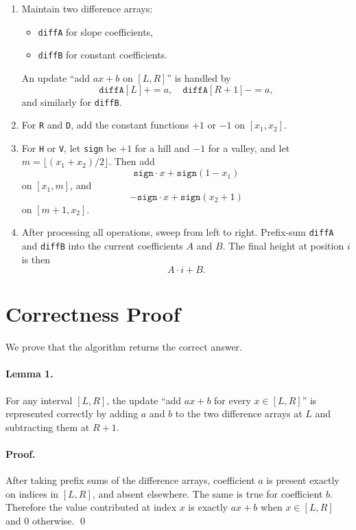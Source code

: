 \documentclass[11pt]{article}
\begin{document}
\begin{enumerate}[leftmargin=*]
    \item Maintain two difference arrays:
    \begin{itemize}[leftmargin=*]
        \item \texttt{diffA} for slope coefficients,
        \item \texttt{diffB} for constant coefficients.
    \end{itemize}
    An update ``add $ax+b$ on $[L,R]$'' is handled by
    \[
        \texttt{diffA}[L] += a,\quad \texttt{diffA}[R+1] -= a,
    \]
    and similarly for \texttt{diffB}.
    \item For \texttt{R} and \texttt{D}, add the constant functions $+1$ or $-1$ on $[x_1,x_2]$.
    \item For \texttt{H} or \texttt{V}, let \texttt{sign} be $+1$ for a hill and $-1$ for a valley, and let
    $m=\lfloor (x_1+x_2)/2 \rfloor$.
    Then add
    \[
        \texttt{sign} \cdot x + \texttt{sign}(1-x_1)
    \]
    on $[x_1,m]$, and
    \[
        -\texttt{sign} \cdot x + \texttt{sign}(x_2+1)
    \]
    on $[m+1,x_2]$.
    \item After processing all operations, sweep from left to right.
    Prefix-sum \texttt{diffA} and \texttt{diffB} into the current coefficients $A$ and $B$.
    The final height at position $i$ is then
    \[
        A \cdot i + B.
    \]
\end{enumerate}

\section*{Correctness Proof}

We prove that the algorithm returns the correct answer.

\paragraph{Lemma 1.}
For any interval $[L,R]$, the update ``add $ax+b$ for every $x \in [L,R]$'' is represented correctly by
adding $a$ and $b$ to the two difference arrays at $L$ and subtracting them at $R+1$.

\paragraph{Proof.}
After taking prefix sums of the difference arrays, coefficient $a$ is present exactly on indices in
$[L,R]$, and absent elsewhere. The same is true for coefficient $b$.
Therefore the value contributed at index $x$ is exactly $ax+b$ when $x \in [L,R]$ and $0$ otherwise.
\qed
\end{document}
